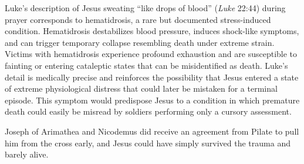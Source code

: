 Luke's description of Jesus sweating ``like drops of blood'' (\emph{Luke} 22:44) during prayer corresponds to hematidrosis, a rare but documented stress-induced condition.
Hematidrosis destabilizes blood pressure, induces shock-like symptoms, and can trigger temporary collapse resembling death under extreme strain.
Victims with hematidrosis experience profound exhaustion and are susceptible to fainting or entering cataleptic states that can be misidentified as death.
Luke's detail is medically precise and reinforces the possibility that Jesus entered a state of extreme physiological distress that could later be mistaken for a terminal episode.
This symptom would predispose Jesus to a condition in which premature death could easily be misread by soldiers performing only a cursory assessment.

Joseph of Arimathea and Nicodemus did receive an agreement from Pilate to pull him from the cross early, and Jesus could have simply survived the trauma and barely alive.

